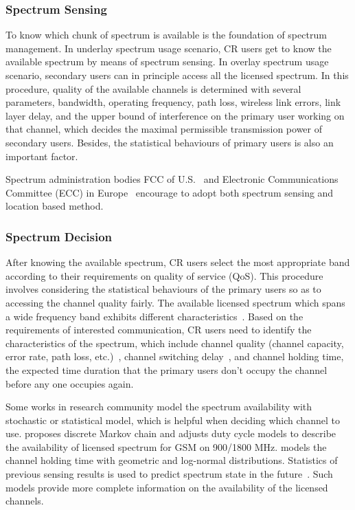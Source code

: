 \subsubsection{Spectrum Sensing}
To know which chunk of spectrum is available is the foundation of spectrum management.
In underlay spectrum usage scenario, CR users get to know the available spectrum by means of spectrum sensing.
In overlay spectrum usage scenario, secondary users can in principle access all the licensed spectrum.
In this procedure, quality of the available channels is determined with several parameters, \ie bandwidth, operating frequency, path loss, wireless link errors, link layer delay, and the upper bound of interference on the primary user working on that channel, which decides the maximal permissible transmission power of secondary users.
Besides, the statistical behaviours of primary users is also an important factor.

Spectrum administration bodies FCC of U.S.~\cite{FCC_2010_sedond_memorandumm} and Electronic Communications Committee (\gls{ECC}) in Europe~\cite{ecc159} encourage to adopt both spectrum sensing and location based method.

\subsubsection{Spectrum Decision}
After knowing the available spectrum, CR users select the most appropriate band according to their requirements on quality of service (QoS).
This procedure involves considering the statistical behaviours of the primary users so as to accessing the channel quality fairly.
The available licensed spectrum which spans a wide frequency band exhibits different characteristics~\cite{spectrum_decision_TMC11}.
Based on the requirements of interested communication, CR users need to identify the characteristics of the spectrum, which include channel quality (channel capacity, error rate, path loss, etc.)~\cite{spectrum_decision_TMC11}, channel switching delay~\cite{channel_switch_delay11}, and channel holding time, \ie the expected time duration that the primary users don't occupy the channel before any one occupies again.

Some works in research community model the spectrum availability with stochastic or statistical model, which is helpful when deciding which channel to use.
\cite{Discrete-Time_Spectrum_Occupancy_Model_DySPAN_2011} proposes discrete Markov chain and adjusts duty cycle models to describe the availability of licensed spectrum for GSM on 900/1800 MHz.
\cite{Wellens200910} models the channel holding time with geometric and log-normal distributions.
Statistics of previous sensing results is used to predict spectrum state in the future~\cite{spectrum-discovery-tmc08}.
Such models provide more complete information on the availability of the licensed channels.




